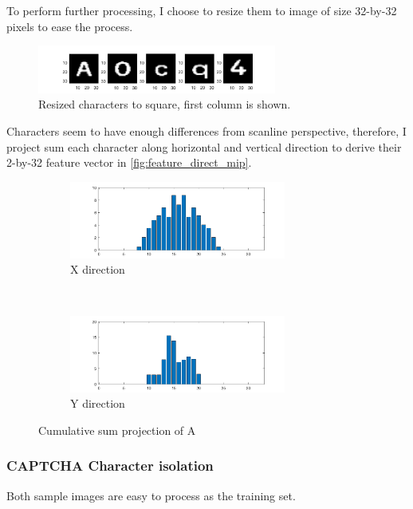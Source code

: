 \documentclass[12pt]{article}
\begin{document}
To perform further processing, I choose to resize them to image of size 32-by-32 pixels to ease the process.

\begin{figure}[H]
    \centering
    \includegraphics[width=0.7\textwidth]{images/training_resized_col1}
    \caption{Resized characters to square, first column is shown.}
\end{figure}

Characters seem to have enough differences from scanline perspective, therefore, I project sum each character along horizontal and vertical direction to derive their 2-by-32 feature vector in \autoref{fig:feature_direct_mip}.

\begin{figure}[H]
    \centering
    \begin{subfigure}[t]{0.5\textwidth}
        \centering
        \includegraphics[height=1in]{images/feature_x_mip_a}
        \caption{X direction}
    \end{subfigure}%
    ~
    \begin{subfigure}[t]{0.5\textwidth}
        \centering
        \includegraphics[height=1in]{images/feature_y_mip_a}
        \caption{Y direction}
    \end{subfigure}
    \caption{Cumulative sum projection of A}
    \label{fig:feature_direct_mip}
\end{figure}

\subsubsection*{CAPTCHA Character isolation}
Both sample images are easy to process as the training set. 
\end{document}
